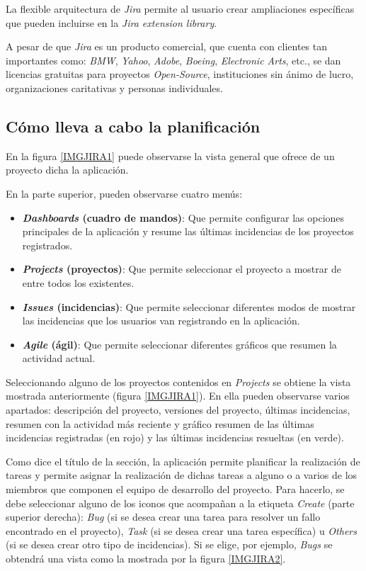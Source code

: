 \documentclass[11pt,a4paper,spanish,twoside]{report}
\begin{document}
	La flexible arquitectura de \emph{Jira} permite al usuario crear ampliaciones
	específicas que pueden incluirse en la \emph{Jira extension library}.

	A pesar de que \emph{Jira} es un producto comercial, que cuenta con clientes
	tan	importantes como: \emph{BMW}, \emph{Yahoo}, \emph{Adobe}, \emph{Boeing},
	\emph{Electronic Arts}, etc., se dan licencias gratuitas para proyectos
	\emph{Open-Source}, instituciones sin ánimo de lucro, organizaciones
	caritativas y personas individuales.

	\subsection{Cómo lleva a cabo la planificación}
	En la figura \ref{IMGJIRA1} puede observarse la vista general que ofrece de
	un proyecto dicha la aplicación.


	En la parte superior, pueden observarse cuatro menús:
	\begin{itemize}
		\item \textbf{\emph{Dashboards} (cuadro de mandos)}: Que permite configurar
		las opciones principales de la aplicación y resume las últimas incidencias
		de los proyectos registrados.
		\item \textbf{\emph{Projects} (proyectos)}: Que permite seleccionar el
		proyecto a mostrar de entre todos los existentes.
		\item \textbf{\emph{Issues} (incidencias)}: Que permite seleccionar
		diferentes modos de mostrar las incidencias que los usuarios van
		registrando en la aplicación.
		\item \textbf{\emph{Agile} (ágil)}: Que permite seleccionar diferentes
		gráficos que resumen la actividad actual.
	\end{itemize}
	Seleccionando alguno de los proyectos contenidos en \emph{Projects} se
	obtiene la vista mostrada anteriormente (figura \ref{IMGJIRA1}).
	En ella pueden observarse varios apartados: descripción del
	proyecto, versiones del proyecto, últimas incidencias, resumen con la
	actividad más reciente y gráfico resumen de las últimas incidencias
	registradas (en rojo) y las	últimas incidencias resueltas (en verde).

	Como dice el título de la sección, la aplicación permite planificar la
	realización de tareas y permite asignar la realización de dichas tareas
	a alguno o a varios de los miembros que componen el equipo de desarrollo
	del proyecto. Para hacerlo, se debe seleccionar alguno de los iconos que
	acompañan a la etiqueta \emph{Create} (parte superior derecha):
	\emph{Bug} (si se desea crear una tarea para resolver un fallo encontrado
	en el proyecto), \emph{Task} (si se desea crear una tarea específica) u
	\emph{Others} (si se desea crear otro tipo de incidencias).
	Si se elige, por ejemplo, \emph{Bugs} se obtendrá una vista como la mostrada
	por la figura \ref{IMGJIRA2}.
	
\end{document}
